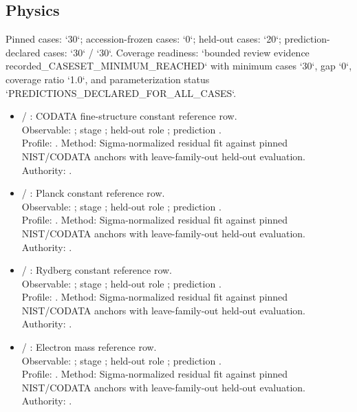 \subsection{Physics}
Pinned cases: `30`; accession-frozen cases: `0`; held-out cases: `20`; prediction-declared cases: `30` / `30`.
Coverage readiness: `bounded review evidence recorded\_CASESET\_MINIMUM\_REACHED` with minimum cases `30`, gap `0`, coverage ratio `1.0`, and parameterization status `PREDICTIONS\_DECLARED\_FOR\_ALL\_CASES`.
\begin{itemize}
\item {} / : CODATA fine-structure constant reference row.\\ Observable: ; stage ; held-out role ; prediction .\\ Profile: . Method: Sigma-normalized residual fit against pinned NIST/CODATA anchors with leave-family-out held-out evaluation. Authority: .
\item {} / : Planck constant reference row.\\ Observable: ; stage ; held-out role ; prediction .\\ Profile: . Method: Sigma-normalized residual fit against pinned NIST/CODATA anchors with leave-family-out held-out evaluation. Authority: .
\item {} / : Rydberg constant reference row.\\ Observable: ; stage ; held-out role ; prediction .\\ Profile: . Method: Sigma-normalized residual fit against pinned NIST/CODATA anchors with leave-family-out held-out evaluation. Authority: .
\item {} / : Electron mass reference row.\\ Observable: ; stage ; held-out role ; prediction .\\ Profile: . Method: Sigma-normalized residual fit against pinned NIST/CODATA anchors with leave-family-out held-out evaluation. Authority: .

\end{itemize}
